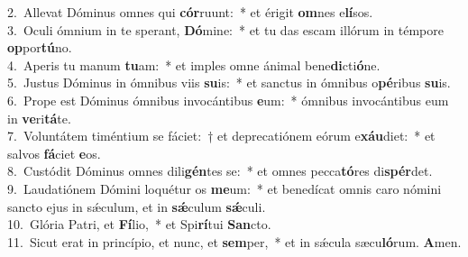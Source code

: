 {2.~}Allevat Dóminus omnes qui \textbf{cór}ruunt:~* et érigit \textbf{om}nes e\textbf{lí}sos.\\
{3.~}Oculi ómnium in te sperant, \textbf{Dó}mine:~* et tu das escam illórum in témpore \textbf{op}por\textbf{tú}no.\\
{4.~}Aperis tu manum \textbf{tu}am:~* et imples omne ánimal bene\textbf{di}cti\textbf{ó}ne.\\
{5.~}Justus Dóminus in ómnibus viis \textbf{su}is:~* et sanctus in ómnibus o\textbf{pé}ribus \textbf{su}is.\\
{6.~}Prope est Dóminus ómnibus invocántibus \textbf{e}um:~* ómnibus invocántibus eum in \textbf{ve}ri\textbf{tá}te.\\
{7.~}Voluntátem timéntium se fáciet:~† et deprecatiónem eórum e\textbf{xáu}diet:~* et salvos \textbf{fá}ciet \textbf{e}os.\\
{8.~}Custódit Dóminus omnes dili\textbf{gén}tes se:~* et omnes pecca\textbf{tó}res di\textbf{spér}det.\\
{9.~}Laudatiónem Dómini loquétur os \textbf{me}um:~* et benedícat omnis caro nómini sancto ejus in sǽculum, et in \textbf{sǽ}culum \textbf{sǽ}culi.\\
{10.~}Glória Patri, et \textbf{Fí}lio,~* et Spi\textbf{rí}tui \textbf{San}cto.\\
{11.~}Sicut erat in princípio, et nunc, et \textbf{sem}per,~* et in sǽcula sæcu\textbf{ló}rum. \textbf{A}men.\\
